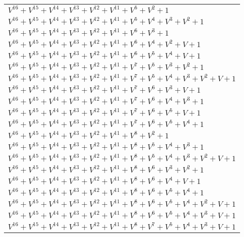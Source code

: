 \documentclass[12pt]{article}
\begin{document}
\begin{adjustwidth}{-4cm}{}
\begin{center}
\begin{longtable}{|l|}
$V^{16}  +V^{15}  +V^{14}  +V^{13}  +V^{12}  +V^{11}  +V^{5}  +V^{2}  + 1$ \\
$V^{16}  +V^{15}  +V^{14}  +V^{13}  +V^{12}  +V^{11}  +V^{5}  +V^{4}  +V^{3}  +V^{2}  + 1$ \\
$V^{16}  +V^{15}  +V^{14}  +V^{13}  +V^{12}  +V^{11}  +V^{6}  +V^{3}  + 1$ \\
$V^{16}  +V^{15}  +V^{14}  +V^{13}  +V^{12}  +V^{11}  +V^{6}  +V^{4}  +V^{2}  + V + 1$ \\
$V^{16}  +V^{15}  +V^{14}  +V^{13}  +V^{12}  +V^{11}  +V^{6}  +V^{5}  +V^{4}  + V + 1$ \\
$V^{16}  +V^{15}  +V^{14}  +V^{13}  +V^{12}  +V^{11}  +V^{7}  +V^{5}  +V^{3}  +V^{2}  + 1$ \\
$V^{16}  +V^{15}  +V^{14}  +V^{13}  +V^{12}  +V^{11}  +V^{7}  +V^{5}  +V^{4}  +V^{3}  +V^{2}  + V + 1$ \\
$V^{16}  +V^{15}  +V^{14}  +V^{13}  +V^{12}  +V^{11}  +V^{7}  +V^{6}  +V^{3}  + V + 1$ \\
$V^{16}  +V^{15}  +V^{14}  +V^{13}  +V^{12}  +V^{11}  +V^{7}  +V^{6}  +V^{4}  +V^{3}  + 1$ \\
$V^{16}  +V^{15}  +V^{14}  +V^{13}  +V^{12}  +V^{11}  +V^{7}  +V^{6}  +V^{5}  + V + 1$ \\
$V^{16}  +V^{15}  +V^{14}  +V^{13}  +V^{12}  +V^{11}  +V^{7}  +V^{6}  +V^{5}  +V^{4}  + 1$ \\
$V^{16}  +V^{15}  +V^{14}  +V^{13}  +V^{12}  +V^{11}  +V^{8}  +V^{2}  + 1$ \\
$V^{16}  +V^{15}  +V^{14}  +V^{13}  +V^{12}  +V^{11}  +V^{8}  +V^{5}  +V^{4}  +V^{3}  + 1$ \\
$V^{16}  +V^{15}  +V^{14}  +V^{13}  +V^{12}  +V^{11}  +V^{8}  +V^{5}  +V^{4}  +V^{3}  +V^{2}  + V + 1$ \\
$V^{16}  +V^{15}  +V^{14}  +V^{13}  +V^{12}  +V^{11}  +V^{8}  +V^{6}  +V^{3}  +V^{2}  + 1$ \\
$V^{16}  +V^{15}  +V^{14}  +V^{13}  +V^{12}  +V^{11}  +V^{8}  +V^{6}  +V^{4}  + V + 1$ \\
$V^{16}  +V^{15}  +V^{14}  +V^{13}  +V^{12}  +V^{11}  +V^{8}  +V^{6}  +V^{5}  +V^{4}  + 1$ \\
$V^{16}  +V^{15}  +V^{14}  +V^{13}  +V^{12}  +V^{11}  +V^{8}  +V^{6}  +V^{5}  +V^{4}  +V^{2}  + V + 1$ \\
$V^{16}  +V^{15}  +V^{14}  +V^{13}  +V^{12}  +V^{11}  +V^{8}  +V^{6}  +V^{5}  +V^{4}  +V^{3}  + V + 1$ \\
$V^{16}  +V^{15}  +V^{14}  +V^{13}  +V^{12}  +V^{11}  +V^{8}  +V^{7}  +V^{5}  +V^{4}  +V^{3}  + V + 1$ \\

\end{longtable}
\end{center}
\end{adjustwidth}
\end{document}
